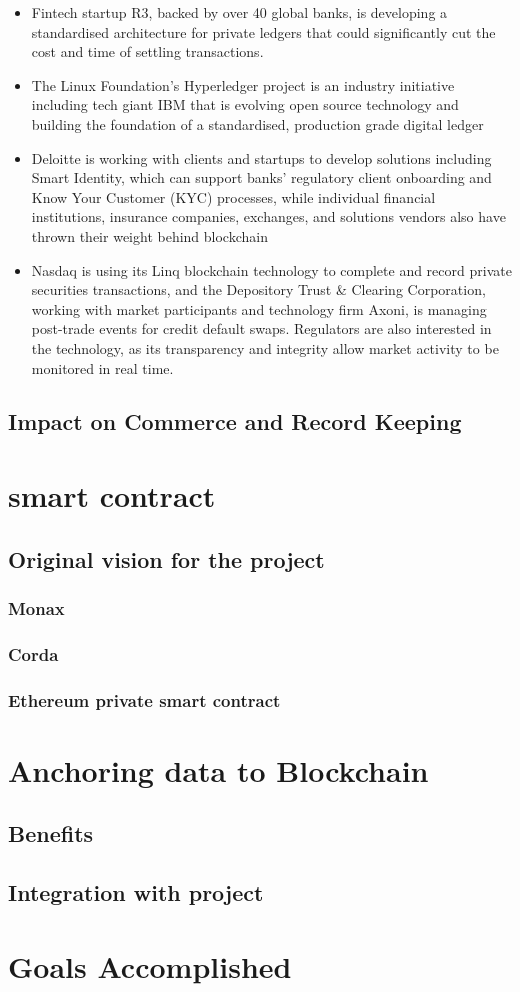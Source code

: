 \begin{itemize}
    \item Fintech startup R3, backed by over 40 global banks, is developing a standardised architecture for private ledgers that could significantly cut the cost and time of settling transactions.
    \item The Linux Foundation’s Hyperledger project is an industry initiative including tech giant IBM that is evolving open source technology and building the foundation of a standardised, production grade digital ledger
    \item Deloitte is working with clients and startups to develop solutions including Smart Identity, which can support banks’ regulatory client onboarding and Know Your Customer (KYC) processes, while individual financial institutions, insurance companies, exchanges, and solutions vendors also have thrown their weight behind blockchain
    \item Nasdaq is using its Linq blockchain technology to complete and record private securities transactions, and the Depository Trust \& Clearing Corporation, working with market participants and technology firm Axoni, is managing post-trade events for credit default swaps. Regulators are also interested in the technology, as its transparency and integrity allow market activity to be monitored in real time. 
\end{itemize}


\subsection{Impact on Commerce and Record Keeping}

\section{smart contract}
\subsection{Original vision for the project}
\subsubsection{Monax}
\subsubsection{Corda}
\subsubsection{Ethereum private smart contract}

\section{Anchoring data to Blockchain}
\subsection{Benefits}
\subsection{Integration with project}

\section{Goals Accomplished}
